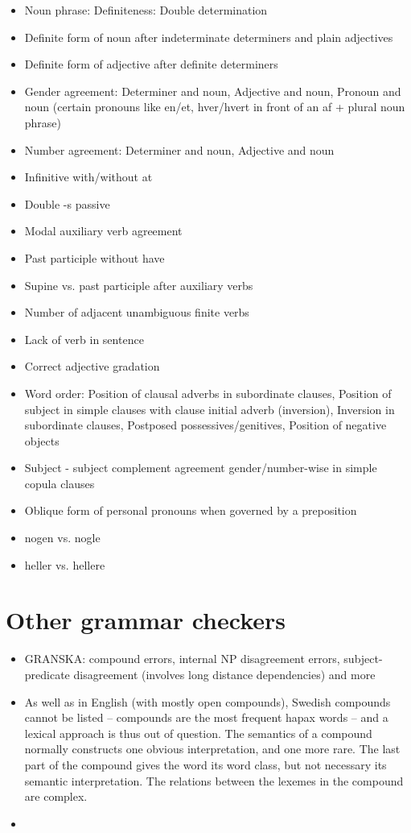 \documentclass[a4paper,english,12pt]{article}
\begin{document}
\begin{spacing}{1.0}
\begin{itemize}
    \item Noun phrase: Definiteness: Double determination
    \item Definite form of noun after indeterminate determiners and plain adjectives
    \item Definite form of adjective after definite determiners
    \item Gender agreement: Determiner and noun, Adjective and noun, Pronoun and noun (certain pronouns like en/et, hver/hvert in front of an af + plural noun phrase)
    \item Number agreement: Determiner and noun, Adjective and noun
	\item    Infinitive with/without at
    \item Double -s passive
    \item Modal auxiliary verb agreement
    \item Past participle without have
    \item Supine vs. past participle after auxiliary verbs
    \item Number of adjacent unambiguous finite verbs
    \item Lack of verb in sentence
	\item Correct adjective gradation
	\item Word order: Position of clausal adverbs in subordinate clauses, Position of subject in simple clauses with clause initial adverb (inversion), Inversion in subordinate clauses, Postposed possessives/genitives, Position of negative objects
	\item Subject - subject complement agreement gender/number-wise in simple copula clauses
    \item Oblique form of personal pronouns when governed by a preposition
    \item nogen vs. nogle
    \item heller vs. hellere
\end{itemize}

\section{Other grammar checkers}
\begin{itemize}
\item \citet{Carlberger2004} GRANSKA: compound errors, internal NP disagreement errors, subject-predicate disagreement (involves long distance dependencies) and more
\item As well as in English (with mostly open compounds), Swedish compounds cannot
be listed – compounds are the most frequent hapax words – and a lexical approach
is thus out of question. The semantics of a compound normally constructs one
obvious interpretation, and one more rare. The last part of the compound gives the
word its word class, but not necessary its semantic interpretation. The relations
between the lexemes in the compound are complex.
\item
\end{itemize}


\end{spacing}
\end{document}

